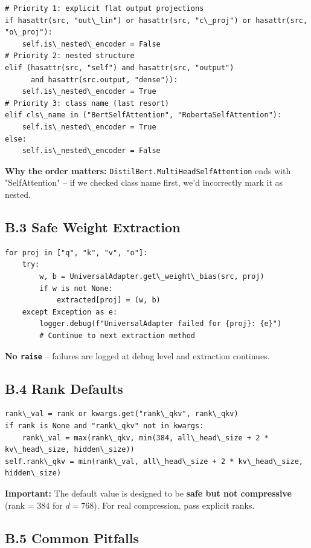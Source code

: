 \begin{lstlisting}
# Priority 1: explicit flat output projections
if hasattr(src, "out\_lin") or hasattr(src, "c\_proj") or hasattr(src, "o\_proj"):
    self.is\_nested\_encoder = False
# Priority 2: nested structure
elif (hasattr(src, "self") and hasattr(src, "output") 
      and hasattr(src.output, "dense")):
    self.is\_nested\_encoder = True
# Priority 3: class name (last resort)
elif cls\_name in ("BertSelfAttention", "RobertaSelfAttention"):
    self.is\_nested\_encoder = True
else:
    self.is\_nested\_encoder = False
\end{lstlisting}

\textbf{Why the order matters:} \texttt{DistilBert.MultiHeadSelfAttention} ends with 
"SelfAttention" -- if we checked class name first, we'd incorrectly mark it 
as nested.

\subsection{B.3 Safe Weight Extraction}

\begin{lstlisting}
for proj in ["q", "k", "v", "o"]:
    try:
        w, b = UniversalAdapter.get\_weight\_bias(src, proj)
        if w is not None:
            extracted[proj] = (w, b)
    except Exception as e:
        logger.debug(f"UniversalAdapter failed for {proj}: {e}")
        # Continue to next extraction method
\end{lstlisting}

\textbf{No \texttt{raise}} -- failures are logged at debug level and extraction continues.

\subsection{B.4 Rank Defaults}

\begin{lstlisting}
rank\_val = rank or kwargs.get("rank\_qkv", rank\_qkv)
if rank is None and "rank\_qkv" not in kwargs:
    rank\_val = max(rank\_qkv, min(384, all\_head\_size + 2 * kv\_head\_size, hidden\_size))
self.rank\_qkv = min(rank\_val, all\_head\_size + 2 * kv\_head\_size, hidden\_size)
\end{lstlisting}

\textbf{Important:} The default value is designed to be \textbf{safe but not compressive} 
(rank = 384 for $d=768$). For real compression, pass explicit ranks.

\subsection{B.5 Common Pitfalls}

